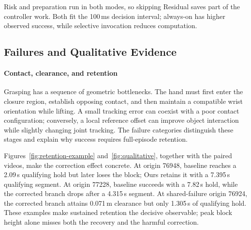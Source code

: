 \documentclass[letterpaper,10pt,conference]{ieeeconf}
\begin{document}
Risk and preparation run in both modes, so skipping Residual saves part of the controller work. Both fit the 100\,ms decision interval; always-on has higher observed success, while selective invocation reduces computation.

\subsection{Failures and Qualitative Evidence}


\paragraph{Contact, clearance, and retention}
Grasping has a sequence of geometric bottlenecks. The hand must first enter the closure region, establish opposing contact, and then maintain a compatible wrist orientation while lifting. A small tracking error can coexist with a poor contact configuration; conversely, a local reference offset can improve object interaction while slightly changing joint tracking. The failure categories distinguish these stages and explain why success requires full-episode retention.

Figures~\ref{fig:retention-example} and~\ref{fig:qualitative}, together with the paired videos, make the correction effect concrete. At origin 76948, baseline reaches a 2.09\,s qualifying hold but later loses the block; Ours retains it with a 7.395\,s qualifying segment. At origin 77228, baseline succeeds with a 7.82\,s hold, while the corrected branch drops after a 4.315\,s segment. At shared-failure origin 76924, the corrected branch attains 0.071\,m clearance but only 1.305\,s of qualifying hold. These examples make sustained retention the decisive observable; peak block height alone misses both the recovery and the harmful correction.
\end{document}
